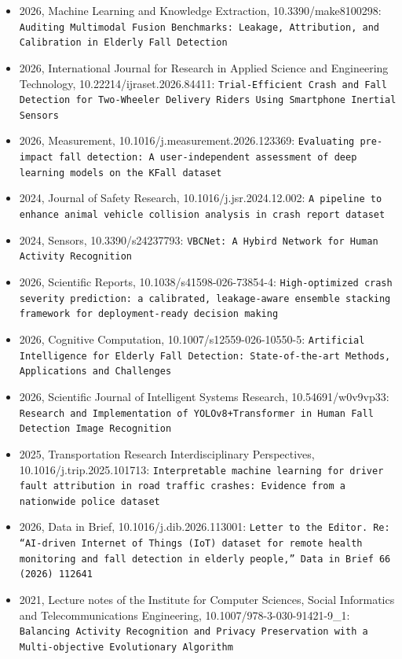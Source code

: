 \begin{itemize}
\item 2026, Machine Learning and Knowledge Extraction, 10.3390/make8100298: \texttt{Auditing Multimodal Fusion Benchmarks: Leakage, Attribution, and Calibration in Elderly Fall Detection}
\item 2026, International Journal for Research in Applied Science and Engineering Technology, 10.22214/ijraset.2026.84411: \texttt{Trial-Efficient Crash and Fall Detection for Two-Wheeler Delivery Riders Using Smartphone Inertial Sensors}
\item 2026, Measurement, 10.1016/j.measurement.2026.123369: \texttt{Evaluating pre-impact fall detection: A user-independent assessment of deep learning models on the KFall dataset}
\item 2024, Journal of Safety Research, 10.1016/j.jsr.2024.12.002: \texttt{A pipeline to enhance animal vehicle collision analysis in crash report dataset}
\item 2024, Sensors, 10.3390/s24237793: \texttt{VBCNet: A Hybird Network for Human Activity Recognition}
\item 2026, Scientific Reports, 10.1038/s41598-026-73854-4: \texttt{High-optimized crash severity prediction: a calibrated, leakage-aware ensemble stacking framework for deployment-ready decision making}
\item 2026, Cognitive Computation, 10.1007/s12559-026-10550-5: \texttt{Artificial Intelligence for Elderly Fall Detection: State-of-the-art Methods, Applications and Challenges}
\item 2026, Scientific Journal of Intelligent Systems Research, 10.54691/w0v9vp33: \texttt{Research and Implementation of YOLOv8+Transformer in Human Fall Detection Image Recognition}
\item 2025, Transportation Research Interdisciplinary Perspectives, 10.1016/j.trip.2025.101713: \texttt{Interpretable machine learning for driver fault attribution in road traffic crashes: Evidence from a nationwide police dataset}
\item 2026, Data in Brief, 10.1016/j.dib.2026.113001: \texttt{Letter to the Editor. Re: ``AI-driven Internet of Things (IoT) dataset for remote health monitoring and fall detection in elderly people,'' Data in Brief 66 (2026) 112641}
\item 2021, Lecture notes of the Institute for Computer Sciences, Social Informatics and Telecommunications Engineering, 10.1007/978-3-030-91421-9\_1: \texttt{Balancing Activity Recognition and Privacy Preservation with a Multi-objective Evolutionary Algorithm}

\end{itemize}
